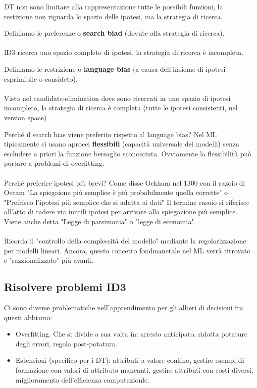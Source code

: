 \begin{note}
    DT non sono limitare alla rappresentazione tutte le possibili funzioni, la restizione non riguarda lo spazio delle ipotesi, ma la strategia di ricerca.
\end{note}
\begin{definition}
    Definiamo le preferenze o \textbf{search biad} (dovute alla strategia di ricerca). \\\\
    ID3 ricerca uno spazio completo di ipotesi, la strategia di ricerca è incompleta.
\end{definition}
\begin{definition}
    Definiamo le restrizione o \textbf{language bias} (a causa dell'insieme di ipotesi esprimibile o consideto).\\\\
    Visto nel candidate-elimination dove sono ricercati in uno spazio di ipotesi incompleto, la strategia di ricerca è completa (tutte le ipotesi consistenti, nel version space)
\end{definition}
Perché il search bias viene preferito rispetto al language bias? Nel ML tipicamente si usano aprocci \textbf{flessibili} (capacità universale dei modelli) senza
escludere a priori la funzione bersaglio sconosciuta. Ovviamente la flessibilità può portare a problemi di overfitting.\\\\
Perché preferire ipotesi più brevi? Come disse Ockham nel 1300 con il razoio di Occam "La spiegaione più semplice è più probabilmente quella corrette" o
"Prefrisco l'ipotesi più semplice che si adatta ai dati" Il termine rasoio si riferisce all'atto di radere via inutili ipotesi per arrivare alla spiegazione più semplice. Viene anche detta
"Legge di parsimonia" o "legge di economia".\\\\
Ricorda il "controllo della complessità del modello" mediante la regolarizzazione per modelli lineari. Ancora, questo concetto fondmanetale
nel ML verrà ritrovato e "razzionalizzato" più avanti.

\subsection{Risolvere problemi ID3}
Ci sono diverse problematiche nell'apprendimento per gli alberi di decisioni fra questi abbiamo:
\begin{itemize}
    \item Overfitting. Che si divide a sua volta in: arresto anticipato, ridotta potature degli errori, regola post-potatura.
    \item Estensioni (specifico per i DT): attributi a valore contino, gestire esempi di formazione con valori di attributo mancanti, gestire attributi con costi diversi, miglioramento dell'efficienza computazionle.
\end{itemize}

